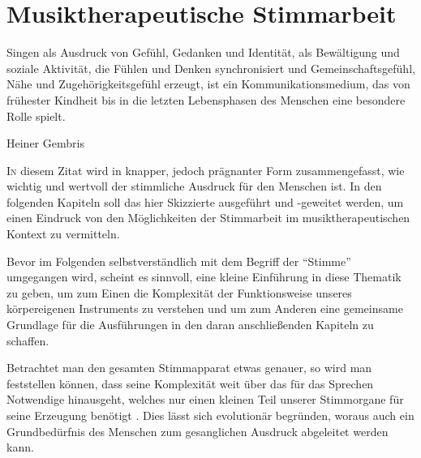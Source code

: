 
\chapter{Musiktherapeutische Stimmarbeit}
\label{chapter:musiktherapeutische_stimmarbeit}

\setlength{\epigraphwidth}{8.0cm}
\begin{spacing}{1.0}
\epigraph{Singen als Ausdruck von Gefühl, Gedanken und Identität, als Bewältigung und soziale Aktivität, die Fühlen und Denken synchronisiert und Gemeinschaftsgefühl, Nähe und Zugehörigkeitsgefühl erzeugt, ist ein Kommunikationsmedium, das von frühester Kindheit bis in die letzten Lebensphasen des Menschen eine besondere Rolle spielt.}{Heiner Gembris \autocite[12]{gembris2008}}
\end{spacing}
\ifpdf
    \graphicspath{{3_musiktherapeutische_stimmarbeit/figures/PNG/}{3_musiktherapeutische_stimmarbeit/figures/PDF/}{3_musiktherapeutische_stimmarbeit/figures/}}
\else
    \graphicspath{{3_musiktherapeutische_stimmarbeit/figures/EPS/}{3_musiktherapeutische_stimmarbeit/figures/}}
\fi
\lettrine{I}{n} diesem Zitat wird in knapper, jedoch prägnanter Form zusammengefasst, wie wichtig und wertvoll der stimmliche Ausdruck für den Menschen ist. In den folgenden Kapiteln soll das hier Skizzierte ausgeführt und -geweitet werden, um einen Eindruck von den Möglichkeiten der Stimmarbeit im musiktherapeutischen Kontext zu vermitteln.

Bevor im Folgenden selbstverständlich mit dem Begriff der "`Stimme"' umgegangen wird, scheint es sinnvoll, eine kleine Einführung in diese Thematik zu geben, um zum Einen die Komplexität der Funktionsweise unseres körpereigenen Instruments zu verstehen und um zum Anderen eine gemeinsame Grundlage für die Ausführungen in den daran anschließenden Kapiteln zu schaffen. 

Betrachtet man den gesamten Stimmapparat etwas genauer, so wird man feststellen können, dass seine Komplexität weit über das für das Sprechen Notwendige hinausgeht, welches nur einen kleinen Teil unserer Stimmorgane für seine Erzeugung benötigt \autocite[vgl.][38]{cramer1998}. Dies lässt sich evolutionär begründen, woraus auch ein Grundbedürfnis des Menschen zum gesanglichen Ausdruck abgeleitet werden kann.


